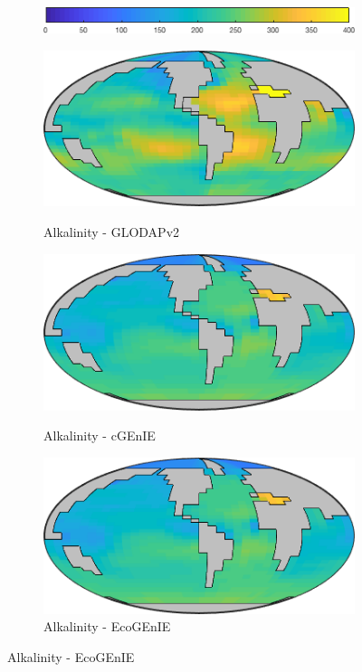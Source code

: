 \documentclass{article}
\begin{document}
\begin{figure}[htp]
\begin{subfigure}{.33\textwidth}
 \label{fig:carbon4}
\end{subfigure}
\\[+0.2cm]
\begin{subfigure}{.5\textwidth}
 \includegraphics[width=0.95\linewidth]{../separate_figures/ECOGEM/ocn_O2_clrbr.png}
\end{subfigure}
\begin{subfigure}{.33\textwidth}
 \caption{Alkalinity - GLODAPv2}
 \includegraphics[width=0.95\linewidth]{../separate_figures/OBSERVATIONS/surface_TALK.png}
 \label{fig:nutrients1}
\end{subfigure}%
\begin{subfigure}{.33\textwidth}
 \caption{Alkalinity - cGEnIE}
 \includegraphics[width=0.95\linewidth]{../separate_figures/BIOGEM/ocn_ALK.png}
 \label{fig:carbon3}
\end{subfigure}%
\begin{subfigure}{.33\textwidth}
 \caption{Alkalinity - EcoGEnIE}
 \includegraphics[width=0.95\linewidth]{../separate_figures/ECOGEM/ocn_ALK.png}

\end{subfigure}
\end{figure}
\end{document}
